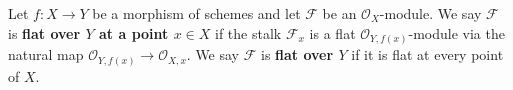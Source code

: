Let $f: X \to Y$ be a morphism of schemes and let $\mathcal{F}$ be an $\mathcal{O}_X$-module. We say $\mathcal{F}$ is \textbf{flat over $Y$ at a point $x \in X$} if the stalk $\mathcal{F}_x$ is a flat $\mathcal{O}_{Y, f(x)}$-module via the natural map $\mathcal{O}_{Y, f(x)} \to \mathcal{O}_{X, x}$. We say $\mathcal{F}$ is \textbf{flat over $Y$} if it is flat at every point of $X$.
